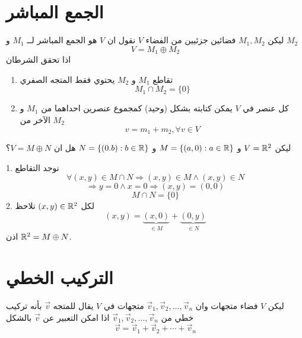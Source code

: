 \section{الجمع المباشر}
ليكن $M_1, M_2$ فضائين جزئيين من الفضاء $V$ نقول ان $V$ هو الجمع المباشر لــ $M_1$ و $M_2$ 
\[
V  = M_1 \oplus M_2
\]
اذا تحقق الشرطان
\begin{enumerate}
	\item تقاطع $M_1$ و $M_2$ يحتوي فقط المتجه الصفري
	\[
	M_1 \cap M_2 = \{0\}
	\]
	\item كل عنصر في $V$ يمكن كتابته بشكل (وحيد) كمجموع عنصرين احداهما من $M_1$ و الآخر من $M_2$
	\[
	v = m_1 + m_2, \forall v\in V
	\]
\end{enumerate}

\begin{example}
	ليكن $V = \mathbb{R}^2$ و $M = \{(a, 0) : a\in \mathbb{R}\}$ و $N = \{(0.b) : b\in \mathbb{R}\}$ هل ان $V = M \oplus N$؟
\end{example}
\begin{solution}
	1. نوجد التقاطع
	\[
	\forall (x, y) \in M \cap N \Rightarrow (x, y) \in M \wedge (x, y)\in N
	\]
	\[
	\Rightarrow y=0 \wedge x=0 \Rightarrow (x, y)=(0,0)
	\]
	\[
	M \cap N = \{0\}
	\]
	2. لكل $(x, y) \in \mathbb{R}^2$ نلاحظ
	\[
	(x, y) = \underbrace{(x, 0)}_{\in M} + \underbrace{(0, y)}_{\in N}
	\]
	اذن $\mathbb{R}^2 = M\oplus N$.
\end{solution}
	
	\section{التركيب الخطي}
	ليكن $V$ فضاء متجهات وان 
	$\vec{v}_1, \vec{v}_2,\dots, \vec{v}_n$
متجهات في $V$ يقال للمتجه $\vec{v}$ بأنه تركيب خطي من $\vec{v}_1, \vec{v}_2,\dots, \vec{v}_n$ اذا امكن التعبير عن $\vec{v}$ بالشكل 
\[
\vec{v} = \vec{v}_1+\vec{v}_2+\cdots +\vec{v}_n
\]


